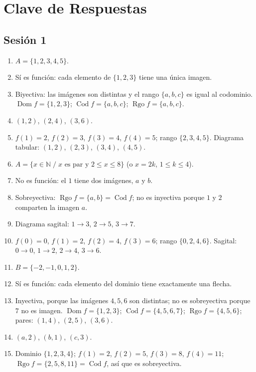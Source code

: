 \documentclass[12pt, letterpaper]{article}
\newcommand{\N}{\mathbb{N}}
\begin{document}
\ifmwclaves
\newpage
\section*{Clave de Respuestas}

\subsection*{Sesión 1}
\begin{enumerate}[leftmargin=*, label=\textbf{\arabic*.}]
  \item $A=\{1,2,3,4,5\}$.
  \item Sí es función: cada elemento de $\{1,2,3\}$ tiene una única imagen.
  \item Biyectiva: las imágenes son distintas y el rango $\{a,b,c\}$ es igual al codominio. $\operatorname{Dom} f=\{1,2,3\}$; $\operatorname{Cod} f=\{a,b,c\}$; $\operatorname{Rgo} f=\{a,b,c\}$.
  \item $(1,2)$, $(2,4)$, $(3,6)$.
  \item $f(1)=2$, $f(2)=3$, $f(3)=4$, $f(4)=5$; rango $\{2,3,4,5\}$. Diagrama tabular: $(1,2)$, $(2,3)$, $(3,4)$, $(4,5)$.
  \item $A=\{x\in\N \;/\; x \text{ es par y } 2\le x\le 8\}$ (o $x=2k$, $1\le k\le 4$).
  \item No es función: el $1$ tiene dos imágenes, $a$ y $b$.
  \item Sobreyectiva: $\operatorname{Rgo} f=\{a,b\}=\operatorname{Cod} f$; no es inyectiva porque $1$ y $2$ comparten la imagen $a$.
  \item Diagrama sagital: $1\to 3$, $2\to 5$, $3\to 7$.
  \item $f(0)=0$, $f(1)=2$, $f(2)=4$, $f(3)=6$; rango $\{0,2,4,6\}$. Sagital: $0\to0$, $1\to2$, $2\to4$, $3\to6$.
  \item $B=\{-2,-1,0,1,2\}$.
  \item Sí es función: cada elemento del dominio tiene exactamente una flecha.
  \item Inyectiva, porque las imágenes $4,5,6$ son distintas; no es sobreyectiva porque $7$ no es imagen. $\operatorname{Dom} f=\{1,2,3\}$; $\operatorname{Cod} f=\{4,5,6,7\}$; $\operatorname{Rgo} f=\{4,5,6\}$; pares: $(1,4)$, $(2,5)$, $(3,6)$.
  \item $(a,2)$, $(b,1)$, $(c,3)$.
  \item Dominio $\{1,2,3,4\}$; $f(1)=2$, $f(2)=5$, $f(3)=8$, $f(4)=11$; $\operatorname{Rgo} f=\{2,5,8,11\}=\operatorname{Cod} f$, así que es sobreyectiva.

\end{enumerate}
\end{document}
